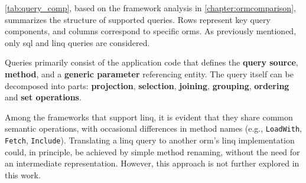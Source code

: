 \autoref{tab:query_comp}, based on the framework analysis in \autoref{chapter:ormcomparison}, summarizes the structure of supported queries. Rows represent key query components, and columns correspond to specific \acrshort{orm}s. As previously mentioned, only \acrshort{sql} and \acrshort{linq} queries are considered.

Queries primarily consist of the application code that defines the \textbf{query source}, \textbf{method}, and a \textbf{generic parameter} referencing entity. The query itself can be decomposed into parts: \textbf{projection}, \textbf{selection}, \textbf{joining}, \textbf{grouping}, \textbf{ordering} and \textbf{set operations}. 

Among the frameworks that support \acrshort{linq}, it is evident that they share common semantic operations, with occasional differences in method names (e.g., \texttt{LoadWith}, \texttt{Fetch}, \texttt{Include}). Translating a \acrshort{linq} query to another \acrshort{orm}'s \acrshort{linq} implementation could, in principle, be achieved by simple method renaming, without the need for an intermediate representation. However, this approach is not further explored in this work.

